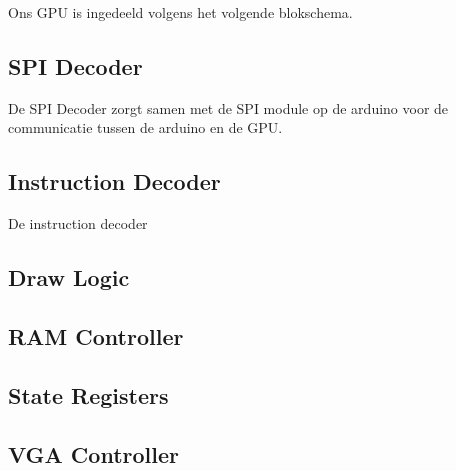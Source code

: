

Ons GPU is ingedeeld volgens het volgende  blokschema.

\subsection{SPI Decoder}
De SPI Decoder zorgt samen met de SPI module op de arduino voor de communicatie tussen de arduino en de GPU.
\subsection{Instruction Decoder}
De instruction decoder
\subsection{Draw Logic}

\subsection{RAM Controller}

\subsection{State Registers}

\subsection{VGA Controller}

